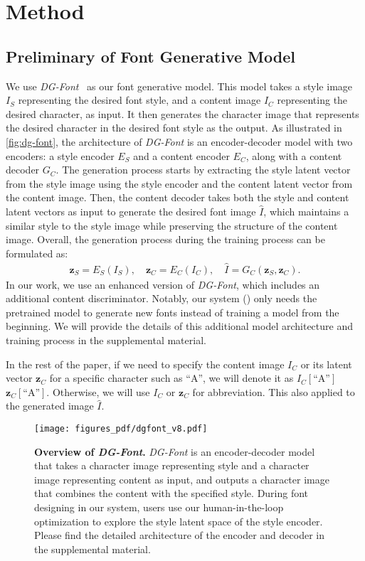 \section{Method}
\subsection{Preliminary of Font Generative Model}
\label{sec:fontgenerativemodel}
We use \textit{DG-Font}~\cite{XieDGFont2021} as our font generative model. 
This model takes a style image $I_{S}$ representing the desired font style, and a content image $I_{C}$ representing the desired character, as input.
It then generates the character image that represents the desired character in the desired font style as the output. 
As illustrated in \autoref{fig:dg-font}, the architecture of \textit{DG-Font} is an encoder-decoder model with two encoders: a style encoder $E_{S}$ and a content encoder $E_{C}$, along with a content decoder $G_{C}$.
The generation process starts by extracting the style latent vector from the style image using the style encoder and the content latent vector from the content image.
Then, the content decoder takes both the style and content latent vectors as input to generate the desired font image $\hat{I}$, which maintains a similar style to the style image while preserving the structure of the content image.
Overall, the generation process during the training process can be formulated as:
\begin{align}
\bm{z}_S = E_{S}(I_S),\quad \bm{z}_C = E_{C}(I_C), \quad 
\hat{I} = G_C(\bm{z}_S, \bm{z}_C).
\end{align}
In our work, we use an enhanced version of \textit{DG-Font}, which includes an additional content discriminator.
Notably, our system (\systemName) only needs the pretrained model to generate new fonts instead of training a model from the beginning.
We will provide the details of this additional model architecture and training process in the supplemental material.

In the rest of the paper, if we need to specify the content image $I_C$ or its latent vector $\bm{z}_C$ for a specific character such as ``A'', we will denote it as  $I_C[\text{``A''}]$ $\bm{z}_C[\text{``A''}]$.
Otherwise, we will use $I_C$ or $\bm{z}_C$ for abbreviation. 
This also applied to the generated image $\hat{I}$.

\begin{figure}[ht]
    \centering
    \texttt{[image: figures\_pdf/dgfont\_v8.pdf]}
    \caption{   
    \textbf{Overview of \textit{DG-Font}.} \textit{DG-Font} is an encoder-decoder model that takes a character image representing style and a character image representing content as input, and outputs a character image that combines the content with the specified style.
    During font designing in our system, users use our human-in-the-loop optimization to explore the style latent space of the style encoder.
    Please find the detailed architecture of the encoder and decoder in the supplemental material.
    }
    \label{fig:dg-font}
\end{figure}


